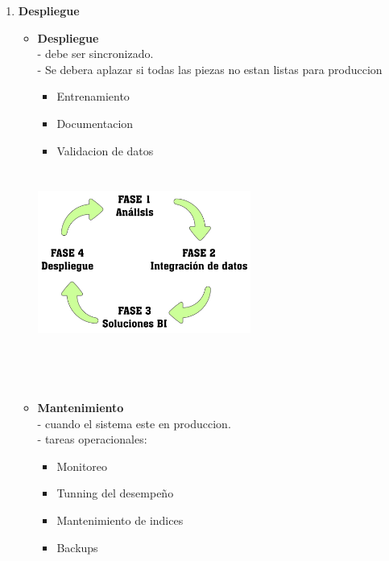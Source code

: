 \documentclass[twoside,twocolumn]{article}
\begin{document}
  \begin{enumerate}  
\item \textbf{Despliegue}
    \begin{itemize}
	    \item \textbf{Despliegue} \\
	    - debe ser sincronizado. \\
	    - Se debera aplazar si todas las piezas no estan listas para produccion
	\begin{itemize}
	    \item Entrenamiento \\
	    \item Documentacion \\
	    \item Validacion de datos \\
    \end{itemize}
    \\
    \includegraphics[width=7cm, height=5cm]{Imagenes/despliegue}
    \\\\\\\\
	\item \textbf{Mantenimiento}\\
	- cuando el sistema este en produccion.\\
	- tareas operacionales:
	\begin{itemize}
	    \item Monitoreo \\
	    \item Tunning del desempeño \\
	    \item Mantenimiento de indices \\
	    \item Backups \\
	    

\end{itemize}
\end{itemize}
\end{enumerate}
\end{document}
